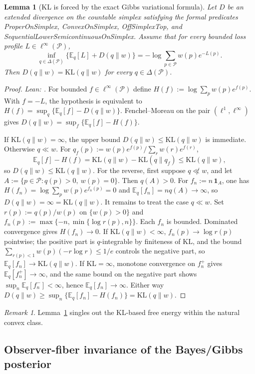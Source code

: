 \documentclass[11pt]{article}
\newtheorem{lemma}[theorem]{Lemma}
\theoremstyle{definition}
\theoremstyle{remark}
\newtheorem{remark}[theorem]{Remark}
\theoremstyle{plain}
\theoremstyle{definition}
\newcommand{\Pcal}{\mathcal{P}}
\newcommand{\E}{\mathbb{E}}
\newcommand{\KL}{\mathrm{KL}}
\newcommand{\one}{\mathbf{1}}
\begin{document}
\begin{lemma}[KL is forced by the exact Gibbs variational formula]
\label{lem:kl-necessity}
Let $D$ be an extended divergence on the countable simplex satisfying the formal predicates \textup{ProperOnSimplex}, \textup{ConvexOnSimplex}, \textup{OffSimplexTop}, and \textup{SequentialLowerSemicontinuousOnSimplex}. Assume that for every bounded loss profile $L\in\ell^\infty(\Pcal)$,
\[
\inf_{q\in\Delta(\Pcal)}\bigl\{\E_q[L]+D(q\|w)\bigr\}
=
-\log\sum_{p\in\Pcal} w(p)e^{-L(p)}.
\]
Then $D(q\|w)=\KL(q\|w)$ for every $q\in\Delta(\Pcal)$.
\end{lemma}

\begin{proof}
\noindent\emph{Lean: .}
For bounded $f\in\ell^\infty(\Pcal)$ define $H(f):=\log\sum_p w(p)e^{f(p)}$. With $f=-L$, the hypothesis is equivalent to $H(f)=\sup_q\{\E_q[f]-D(q\|w)\}$. Fenchel--Moreau on the pair $(\ell^1,\ell^\infty)$ gives $D(q\|w)=\sup_f\{\E_q[f]-H(f)\}$.

If $\KL(q\|w)=\infty$, the upper bound $D(q\|w)\le \KL(q\|w)$ is immediate. Otherwise $q\ll w$. For $q_f(p):=w(p)e^{f(p)}/\sum_r w(r)e^{f(r)}$,
\[
\E_q[f]-H(f)=\KL(q\|w)-\KL(q\|q_f)\le \KL(q\|w),
\]
so $D(q\|w)\le\KL(q\|w)$. For the reverse, first suppose $q\not\ll w$, and let $A:=\{p\in\Pcal:q(p)>0,\ w(p)=0\}$. Then $q(A)>0$. For $f_n:=n\,\one_A$, one has $H(f_n)=\log\sum_p w(p)e^{f_n(p)}=0$ and $\E_q[f_n]=nq(A)\to\infty$, so $D(q\|w)=\infty=\KL(q\|w)$. It remains to treat the case $q\ll w$. Set $r(p):=q(p)/w(p)$ on $\{w(p)>0\}$ and $f_n(p):=\max\{-n,\min\{\log r(p),n\}\}$. Each $f_n$ is bounded. Dominated convergence gives $H(f_n)\to 0$. If $\KL(q\|w)<\infty$, $f_n(p)\to\log r(p)$ pointwise; the positive part is $q$-integrable by finiteness of $\KL$, and the bound $\sum_{r(p)<1}w(p)(-r\log r)\le 1/e$ controls the negative part, so $\E_q[f_n]\to\KL(q\|w)$. If $\KL=\infty$, monotone convergence on $f_n^+$ gives $\E_q[f_n^+]\to\infty$, and the same bound on the negative part shows $\sup_n\E_q[f_n^-]<\infty$, hence $\E_q[f_n]\to\infty$. Either way $D(q\|w)\ge\sup_n\{\E_q[f_n]-H(f_n)\}=\KL(q\|w)$.
\end{proof}

\begin{remark}
Lemma~\ref{lem:kl-necessity} singles out the KL-based free energy within the natural convex class.
\end{remark}

\subsection{Observer-fiber invariance of the Bayes/Gibbs posterior}
\end{document}
